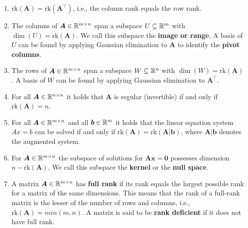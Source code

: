 \begin{enumerate}
    \item $\text{rk}(\bm{A}) = \text{rk}(\bm{A}^\top)$, i.e., the column rank equals the row rank.
    \hfill \cite{mfml/book/mml/Deisenroth-Faisal-Ong}

    \item The columns of $\bm{A} \in \mathbb{R}^{m\times n}$ span a subspace $U \subseteq \mathbb{R}^m$ with $\dim(U) = \text{rk}(\bm{A})$.
    We call this subspace the \textbf{image or range}.
    A basis of $U$ can be found by applying Gaussian elimination to $\bm{A}$ to identify the \textbf{pivot columns}.
    \hfill \cite{mfml/book/mml/Deisenroth-Faisal-Ong}

    \item The rows of $\bm{A} \in  \mathbb{R}^{m\times n}$  span a subspace $W \subseteq \mathbb{R}^n$ with $\dim(W) = \text{rk}(\bm{A})$.
    A basis of $W$ can be found by applying Gaussian elimination to $\bm{A}^\top$.
    \hfill \cite{mfml/book/mml/Deisenroth-Faisal-Ong}

    \item For all $\bm{A} \in  \mathbb{R}^{n\times n}$ it holds that $\bm{A}$ is regular (invertible) if and only if $\text{rk}(\bm{A}) = n$.
    \hfill \cite{mfml/book/mml/Deisenroth-Faisal-Ong}

    \item For all $\bm{A} \in  \mathbb{R}^{m\times n}$  and all $\bm{b} \in  \mathbb{R}^m$ it holds that the linear equation system $Ax = b$ can be solved if and only if $\text{rk}(\bm{A}) = \text{rk}(\bm{A}|\bm{b})$, where $\bm{A}|\bm{b}$ denotes the augmented system.
    \hfill \cite{mfml/book/mml/Deisenroth-Faisal-Ong}

    \item For $\bm{A} \in  \mathbb{R}^{m\times n}$  the subspace of solutions for $\bm{A}\bm{x} = \bm{0}$ possesses dimension $n - \text{rk}(\bm{A})$.
    We call this subspace the \textbf{kernel} or the \textbf{null space}.
    \hfill \cite{mfml/book/mml/Deisenroth-Faisal-Ong}

    \item A matrix $\bm{A} \in  \mathbb{R}^{m\times n}$  has \textbf{full rank} if its rank equals the largest possible rank for a matrix of the same dimensions.
    This means that the rank of a full-rank matrix is the lesser of the number of rows and columns, i.e., $\text{rk}(\bm{A}) = min(m, n)$.
    A matrix is said to be \textbf{rank deficient} if it does not have full rank.
    \hfill \cite{mfml/book/mml/Deisenroth-Faisal-Ong}


\end{enumerate}



